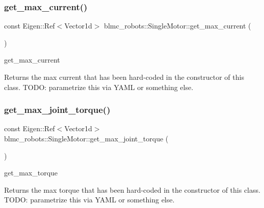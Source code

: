 \subsubsection{\texorpdfstring{get\+\_\+max\+\_\+current()}{get\_max\_current()}}
{\footnotesize\ttfamily const Eigen\+::\+Ref$<$Vector1d$>$ blmc\+\_\+robots\+::\+Single\+Motor\+::get\+\_\+max\+\_\+current (\begin{DoxyParamCaption}{ }\end{DoxyParamCaption})\hspace{0.3cm}{\ttfamily [inline]}}



get\+\_\+max\+\_\+current 

\begin{DoxyReturn}{Returns}
the max current that has been hard-\/coded in the constructor of this class. T\+O\+DO\+: parametrize this via Y\+A\+ML or something else. 
\end{DoxyReturn}
\mbox{\label{classblmc__robots_1_1SingleMotor_af83ef444bdd1eebdac1df6d8035d2b75}} 
\subsubsection{\texorpdfstring{get\+\_\+max\+\_\+joint\+\_\+torque()}{get\_max\_joint\_torque()}}
{\footnotesize\ttfamily const Eigen\+::\+Ref$<$Vector1d$>$ blmc\+\_\+robots\+::\+Single\+Motor\+::get\+\_\+max\+\_\+joint\+\_\+torque (\begin{DoxyParamCaption}{ }\end{DoxyParamCaption})\hspace{0.3cm}{\ttfamily [inline]}}



get\+\_\+max\+\_\+torque 

\begin{DoxyReturn}{Returns}
the max torque that has been hard-\/coded in the constructor of this class. T\+O\+DO\+: parametrize this via Y\+A\+ML or something else. 
\end{DoxyReturn}
\mbox{\label{classblmc__robots_1_1SingleMotor_ab3330ea642ca97c094f2af7b50a7a747}} 

